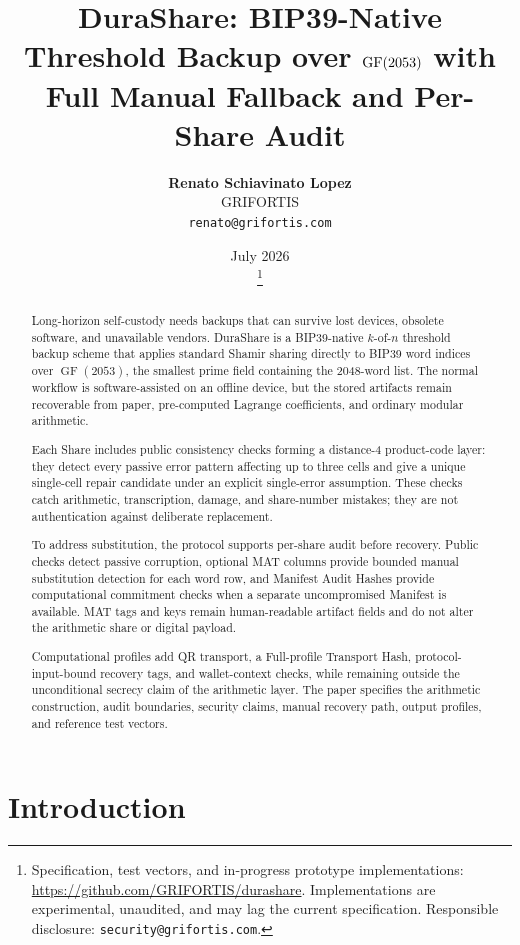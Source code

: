 \documentclass[11pt]{article}
\title{\textbf{DuraShare: BIP39-Native Threshold Backup over $\GF(2053)$ with Full Manual Fallback and Per-Share Audit}}
\author{
    \textbf{Renato Schiavinato Lopez} \\
    GRIFORTIS \\
    \texttt{renato@grifortis.com}
}
\date{July 2026\\\DuraShareVersion\thanks{%
    Specification, test vectors, and in-progress prototype implementations:
    \url{https://github.com/GRIFORTIS/durashare}.
    Implementations are experimental, unaudited, and may lag the current specification.
    Responsible disclosure: \texttt{security@grifortis.com}.}}
\newcommand{\GF}{\operatorname{GF}}
\begin{document}
\maketitle

\begin{abstract}
Long-horizon self-custody needs backups that can survive lost devices, obsolete software, and unavailable vendors. DuraShare is a BIP39-native $k$-of-$n$ threshold backup scheme that applies standard Shamir sharing directly to BIP39 word indices over $\GF(2053)$, the smallest prime field containing the 2048-word list. The normal workflow is software-assisted on an offline device, but the stored artifacts remain recoverable from paper, pre-computed Lagrange coefficients, and ordinary modular arithmetic.

Each Share includes public consistency checks forming a distance-4 product-code layer: they detect every passive error pattern affecting up to three cells and give a unique single-cell repair candidate under an explicit single-error assumption. These checks catch arithmetic, transcription, damage, and share-number mistakes; they are not authentication against deliberate replacement.

To address substitution, the protocol supports per-share audit before recovery. Public checks detect passive corruption, optional MAT columns provide bounded manual substitution detection for each word row, and Manifest Audit Hashes provide computational commitment checks when a separate uncompromised Manifest is available. MAT tags and keys remain human-readable artifact fields and do not alter the arithmetic share or digital payload.

Computational profiles add QR transport, a Full-profile Transport Hash, protocol-input-bound recovery tags, and wallet-context checks, while remaining outside the unconditional secrecy claim of the arithmetic layer. The paper specifies the arithmetic construction, audit boundaries, security claims, manual recovery path, output profiles, and reference test vectors.
\end{abstract}

\section{Introduction}
\label{sec:intro}
\end{document}
